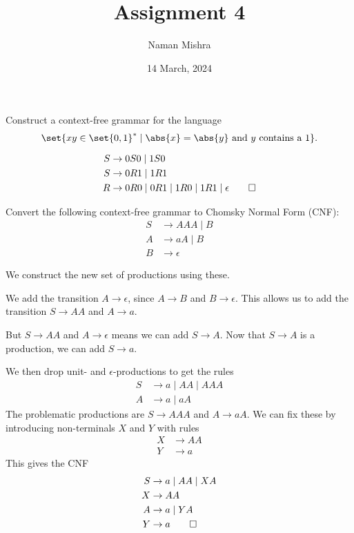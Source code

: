 \documentclass[12pt]{article}
\title      {Assignment 4}
\author{Naman Mishra}
\date{14 March, 2024}
\begin{document}
\maketitle
\begin{problem*}
    Construct a context-free grammar for the language \[
        \set{xy \in \set{0, 1}^* \mid \abs{x} = \abs{y} \text{ and } y
        \text{ contains a } 1}.
    \]
\end{problem*}
\begin{solution}
    \begin{align*}
        S &\to 0 S 0 \mid 1 S 0 \\
        S &\to 0 R 1 \mid 1 R 1 \\
        R &\to 0 R 0 \mid 0 R 1 \mid 1 R 0 \mid 1 R 1 \mid \epsilon \qedhere
    \end{align*}
\end{solution}

\begin{problem*}
    Convert the following context-free grammar to Chomsky Normal Form (CNF):
    \begin{align*}
        S &\to AAA \mid B \\
        A &\to aA \mid B \\
        B &\to \epsilon
    \end{align*}
\end{problem*}
\begin{solution}
    We construct the new set of productions using these.

    We add the transition $A \to \epsilon$, since $A \to B$ and
    $B \to \epsilon$.
    This allows us to add the transition $S \to AA$ and $A \to a$.

    But $S \to AA$ and $A \to \epsilon$ means we can add $S \to A$.
    Now that $S \to A$ is a production, we can add $S \to a$.

    We then drop unit- and $\epsilon$-productions to get the rules
    \begin{align*}
        S &\to a \mid AA \mid AAA \\
        A &\to a \mid aA
    \end{align*}
    The problematic productions are $S \to AAA$ and $A \to aA$.
    We can fix these by introducing non-terminals $X$ and $Y$ with rules
    \begin{align*}
        X &\to AA \\
        Y &\to a
    \end{align*}
    This gives the CNF
    \begin{align*}
        S &\to a \mid AA \mid XA \\
        X &\to AA \\
        A &\to a \mid YA \\
        Y &\to a \qedhere
    \end{align*}
\end{solution}
\end{document}
